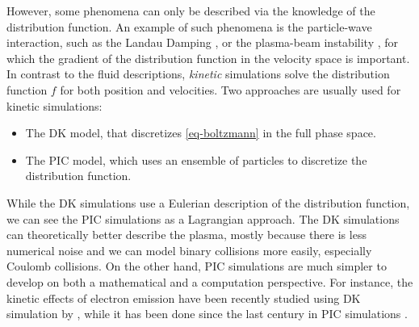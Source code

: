 \vspace{1em}
However, some phenomena can only be described via the knowledge of the distribution function.
An example of such phenomena is the particle-wave interaction, such as the Landau Damping \citep{landau1945,malmberg1964}, or the plasma-beam instability \citep{filippychev1990}, for which the gradient of the distribution function in the velocity space is important.
In contrast to the fluid descriptions, \emph{kinetic} simulations solve the distribution function $f$ for both position and velocities.
Two approaches are usually used for kinetic simulations\string:
\begin{itemize}
  \item The \ac{DK} model, that discretizes \cref{eq-boltzmann} in the full phase space.
  \item The \ac{PIC} model, which uses an ensemble of particles to discretize the distribution function.
\end{itemize} 
While the \ac{DK} simulations use a Eulerian description of the distribution function, we can see the \ac{PIC} simulations as a Lagrangian approach.
The \ac{DK} simulations can theoretically better describe the plasma, mostly because there is less numerical noise and we can model binary collisions more easily, especially Coulomb collisions.
On the other hand, \ac{PIC} simulations are much simpler to develop on both a mathematical and a computation perspective.
For instance, the kinetic effects of electron emission have been recently studied using \ac{DK} simulation by \citet{cagas2019}, while it has been done since the last century in \ac{PIC} simulations \citep{boswell1988}.



